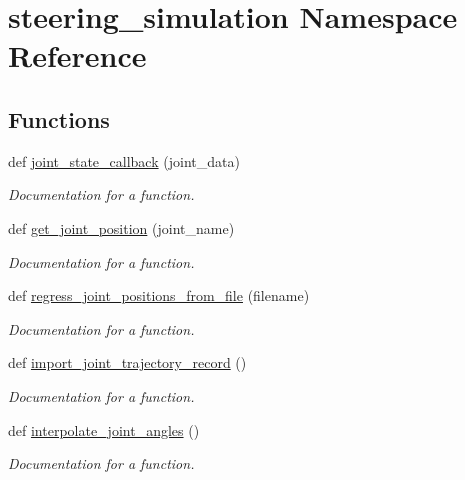 \hypertarget{namespacesteering__simulation}{}\section{steering\+\_\+simulation Namespace Reference}
\label{namespacesteering__simulation}
\subsection*{Functions}
\begin{DoxyCompactItemize}
\item 
def \mbox{\hyperlink{namespacesteering__simulation_a04ebcaad2fa2cbdb0fd13fdb179d0f50}{joint\+\_\+state\+\_\+callback}} (joint\+\_\+data)
\begin{DoxyCompactList}\small\item\em Documentation for a function. \end{DoxyCompactList}\item 
def \mbox{\hyperlink{namespacesteering__simulation_af5611a9446037e0aee0542ebe1c111fc}{get\+\_\+joint\+\_\+position}} (joint\+\_\+name)
\begin{DoxyCompactList}\small\item\em Documentation for a function. \end{DoxyCompactList}\item 
def \mbox{\hyperlink{namespacesteering__simulation_af85ca971fcf35d30c3647fb0c3732195}{regress\+\_\+joint\+\_\+positions\+\_\+from\+\_\+file}} (filename)
\begin{DoxyCompactList}\small\item\em Documentation for a function. \end{DoxyCompactList}\item 
def \mbox{\hyperlink{namespacesteering__simulation_a628f6027d970db8d4071e5846de522fc}{import\+\_\+joint\+\_\+trajectory\+\_\+record}} ()
\begin{DoxyCompactList}\small\item\em Documentation for a function. \end{DoxyCompactList}\item 
def \mbox{\hyperlink{namespacesteering__simulation_a6e3b1fe25edfbec1713a6bd3ef2a445e}{interpolate\+\_\+joint\+\_\+angles}} ()
\begin{DoxyCompactList}\small\item\em Documentation for a function. \end{DoxyCompactList}\item 

\end{DoxyCompactItemize}
